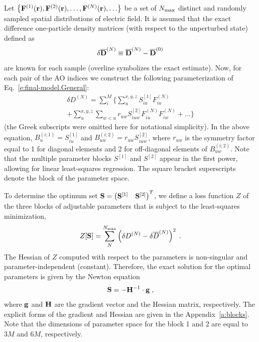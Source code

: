\documentclass[aip,amsmath,amssymb,reprint,floatfix]{revtex4-1}
\begin{document}
Let  
$\left\{ {\bf F}^{(1)}({\bf r}), {\bf F}^{(2)}({\bf r}), \ldots, {\bf F}^{(N)}({\bf r}), \ldots \right\}$ 
be a set of $N_{\rm max}$ distinct and randomly sampled 
spatial distributions of electric field. It is assumed that
the exact difference one\hyp{}particle density matrices (with respect to the unperturbed state)
defined as
%
\begin{equation}
 \delta \overline{\bf D}^{(N)} \equiv \overline{\bf D}^{(N)} - \overline{\bf D}^{(0)}
\end{equation}
%
are known for each sample (overline symbolizes the exact estimate).
Now, for each pair of the AO indices we construct the following 
parameterization of Eq.~\eqref{e:final-model.General}:
%
\begin{multline}\label{e:final-model.General.Parameters}
 \delta D^{(N)} = \sum_{i }^M \Big\{ 
                              \sum_u^{x,y,z} S^{[1]}_{iu} F_{iu}^{(N)} \\
                +             \sum_{u}^{x,y,z} \sum_{w<u} r_{uw} S^{[2]}_{iuw} F_{iu}^{(N)} F_{iw}^{(N)} 
                        + \ldots \Big\}
\end{multline}
%
(the Greek subscripts were omitted here for notational simplicity).
In the above equation, $B_u^{(i;1)} = S^{[1]}_{iu}$ and $B_{uw}^{(i;2)} = r_{uw} S^{[2]}_{iuw}$,
where $r_{uw}$ is the symmetry factor equal to 1 for diagonal elements and 2 for off\hyp{}diagonal
elements of $B_{uw}^{(i;2)}$.
Note that the multiple parameter blocks 
$S^{[1]}$ and $S^{[2]}$
appear in the first power, allowing for linear least\hyp{}squares regression.
The square bracket superscripts denote the block of the parameter space. 

To determine the optimum set 
$
 {\bf S} = 
\begin{pmatrix}
{\bf S}^{[1]} &
{\bf S}^{[2]} 
\end{pmatrix}^T
$, we define a loss function $Z$ 
of the three blocks of adjustable parameters
that is subject to the least\hyp{}squares minimization,
%
\begin{equation}\label{e:Z}
 Z[{\bf S}] = \sum_N^{N_{\rm max}} \left( \delta D^{(N)} - \delta \overline{D}^{(N)} \right)^2 \;.
\end{equation}
%
The Hessian of $Z$ computed with respect to the parameters is non\hyp{}singular
and parameter\hyp{}independent (constant).
Therefore, the exact solution for the optimal parameters is given by the Newton equation
%
\begin{equation}\label{e:Newton}
 {\bf S} = -{\bf H}^{-1} \cdot {\bf g} \;,
\end{equation}
%
where ${\bf g}$ and ${\bf H}$ are the gradient vector and the Hessian matrix, respectively.
The explicit forms of the gradient and Hessian are given in the Appendix~\ref{a:blocks}.
Note that the dimensions of parameter space for the block 1 and 2 are
equal to $3M$ and $6M$, respectively.
\end{document}
